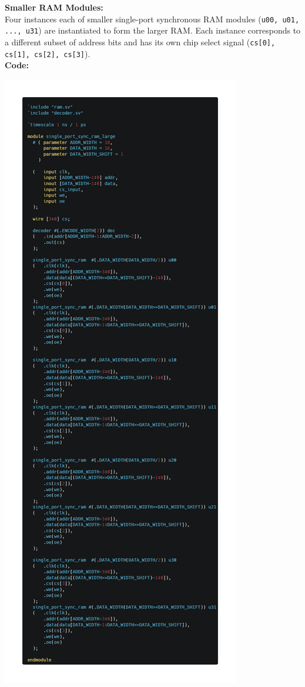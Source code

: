 \documentclass[12pt]{article}
\begin{document}
\textbf{Smaller RAM Modules:}\\
Four instances each of smaller single-port synchronous RAM modules (\verb|u00, u01, ..., u31|) are instantiated to form the larger RAM. Each instance corresponds to a different subset of address bits and has its own chip select signal (\verb|cs[0], cs[1], cs[2], cs[3]|).\\
\pagebreak
\textbf{Code:}
\begin{center}
    \includegraphics[scale=0.38]{images/ram_large.png}
\end{center}
\end{document}
